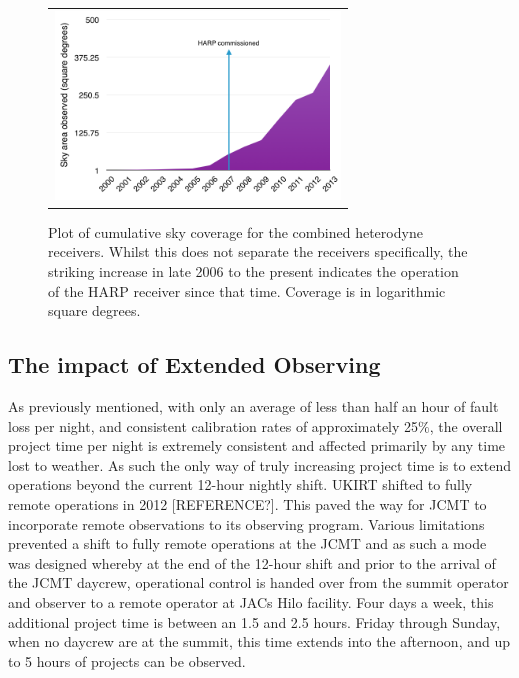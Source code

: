 \documentclass[]{spie}  %
\begin{document}
\begin{figure}[h]
   \begin{center}
   \begin{tabular}{c}
   \includegraphics[height=5cm]{heterodyne_areacover.png}
   \end{tabular}
   \end{center}
   \caption{\label{fig:het} Plot of cumulative sky coverage for the combined heterodyne receivers. Whilst this does not separate the receivers specifically, the striking increase in late 2006 to the present indicates the operation of the HARP receiver since that time. Coverage is in logarithmic square degrees.}
\end{figure}

\subsection{The impact of Extended Observing}\label{sec:eo}


As previously mentioned, with only an average of less than half an
hour of fault loss per night, and consistent calibration rates of
approximately 25$\%$, the overall project time per night is extremely
consistent and affected primarily by any time lost to weather. As such
the only way of truly increasing project time is to extend operations
beyond the current 12-hour nightly shift. UKIRT shifted to fully
remote operations in 2012 [REFERENCE?]. This paved the way for JCMT to
incorporate remote observations to its observing program. Various
limitations prevented a shift to fully remote operations at the JCMT
and as such a mode was designed whereby at the end of the 12-hour
shift and prior to the arrival of the JCMT daycrew, operational
control is handed over from the summit operator and observer to a
remote operator at JACs Hilo facility. Four days a week, this
additional project time is between an 1.5 and 2.5 hours. Friday
through Sunday, when no daycrew are at the summit, this time extends
into the afternoon, and up to 5 hours of projects can be observed.
\end{document}
